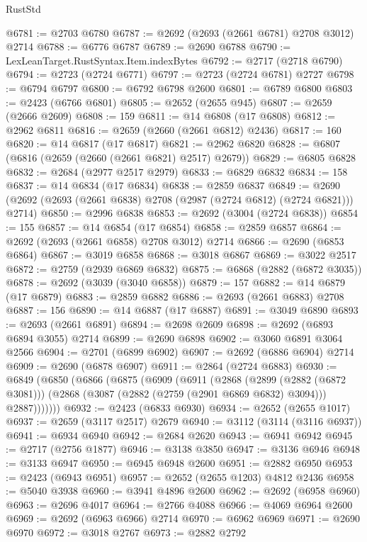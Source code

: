 \begin{lexlean}{RustStd}
\begin{coremodule}
@6781 := @2703 @6780
@6787 := @2692 (@2693 (@2661 @6781) @2708 @3012) @2714
@6788 := @6776 @6787
@6789 := @2690 @6788
@6790 := LexLeanTarget.RustSyntax.Item.indexBytes
@6792 := @2717 (@2718 @6790)
@6794 := @2723 (@2724 @6771)
@6797 := @2723 (@2724 @6781) @2727
@6798 := @6794 @6797
@6800 := @6792 @6798 @2600
@6801 := @6789 @6800
@6803 := @2423 (@6766 @6801)
@6805 := @2652 (@2655 @945)
@6807 := @2659 (@2666 @2609)
@6808 := 159
@6811 := @14 @6808 (@17 @6808)
@6812 := @2962 @6811
@6816 := @2659 (@2660 (@2661 @6812) @2436)
@6817 := 160
@6820 := @14 @6817 (@17 @6817)
@6821 := @2962 @6820
@6828 := @6807 (@6816 (@2659 (@2660 (@2661 @6821) @2517) @2679))
@6829 := @6805 @6828
@6832 := @2684 (@2977 @2517 @2979)
@6833 := @6829 @6832
@6834 := 158
@6837 := @14 @6834 (@17 @6834)
@6838 := @2859 @6837
@6849 := @2690 (@2692 (@2693 (@2661 @6838) @2708 (@2987 (@2724 @6812) (@2724 @6821))) @2714)
@6850 := @2996 @6838
@6853 := @2692 (@3004 (@2724 @6838))
@6854 := 155
@6857 := @14 @6854 (@17 @6854)
@6858 := @2859 @6857
@6864 := @2692 (@2693 (@2661 @6858) @2708 @3012) @2714
@6866 := @2690 (@6853 @6864)
@6867 := @3019 @6858
@6868 := @3018 @6867
@6869 := @3022 @2517
@6872 := @2759 (@2939 @6869 @6832)
@6875 := @6868 (@2882 (@6872 @3035))
@6878 := @2692 (@3039 (@3040 @6858))
@6879 := 157
@6882 := @14 @6879 (@17 @6879)
@6883 := @2859 @6882
@6886 := @2693 (@2661 @6883) @2708
@6887 := 156
@6890 := @14 @6887 (@17 @6887)
@6891 := @3049 @6890
@6893 := @2693 (@2661 @6891)
@6894 := @2698 @2609
@6898 := @2692 (@6893 @6894 @3055) @2714
@6899 := @2690 @6898
@6902 := @3060 @6891 @3064 @2566
@6904 := @2701 (@6899 @6902)
@6907 := @2692 (@6886 @6904) @2714
@6909 := @2690 (@6878 @6907)
@6911 := @2864 (@2724 @6883)
@6930 := @6849
    (@6850
      (@6866
        (@6875
          (@6909
            (@6911
              (@2868
                (@2899 (@2882 (@6872 @3081)))
                (@2868 (@3087 (@2882 (@2759 (@2901 @6869 @6832) @3094))) @2887)))))))
@6932 := @2423 (@6833 @6930)
@6934 := @2652 (@2655 @1017)
@6937 := @2659 (@3117 @2517) @2679
@6940 := @3112 (@3114 (@3116 @6937))
@6941 := @6934 @6940
@6942 := @2684 @2620
@6943 := @6941 @6942
@6945 := @2717 (@2756 @1877)
@6946 := @3138 @3850
@6947 := @3136 @6946
@6948 := @3133 @6947
@6950 := @6945 @6948 @2600
@6951 := @2882 @6950
@6953 := @2423 (@6943 @6951)
@6957 := @2652 (@2655 @1203) @4812 @2436
@6958 := @5040 @3938
@6960 := @3941 @4896 @2600
@6962 := @2692 (@6958 @6960)
@6963 := @2696 @4017
@6964 := @2766 @4088
@6966 := @4069 @6964 @2600
@6969 := @2692 (@6963 @6966) @2714
@6970 := @6962 @6969
@6971 := @2690 @6970
@6972 := @3018 @2767
@6973 := @2882 @2792

\end{coremodule}
\end{lexlean}
